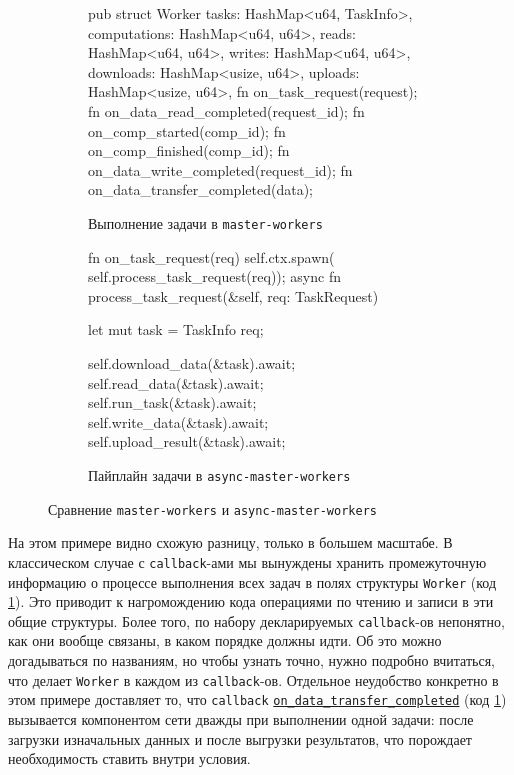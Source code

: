 \begin{figure}[H]
    \hspace{-0.55cm}
    \centering
    \begin{subfigure}[b]{0.537\linewidth}
        \footnotesize
        \centering
        \begin{rustcode}
pub struct Worker {
  tasks: HashMap<u64, TaskInfo>,
  computations: HashMap<u64, u64>,
  reads: HashMap<u64, u64>,
  writes: HashMap<u64, u64>,
  downloads: HashMap<usize, u64>,
  uploads: HashMap<usize, u64>,
}
fn on_task_request(request);
fn on_data_read_completed(request_id);
fn on_comp_started(comp_id);
fn on_comp_finished(comp_id);
fn on_data_write_completed(request_id);
fn on_data_transfer_completed(data);
    \end{rustcode}
        \caption{Выполнение задачи в \texttt{master-workers}}
        \label{master-workers}
    \end{subfigure}
    \hfill
    \begin{subfigure}[b]{0.48\linewidth}
        \footnotesize
        \centering
        \begin{rustcode}
fn on_task_request(req) {
  self.ctx.spawn(
    self.process_task_request(req));
}
async fn process_task_request(&self, req: TaskRequest) {
  let mut task = TaskInfo {req};

  self.download_data(&task).await;
  self.read_data(&task).await;
  self.run_task(&task).await;
  self.write_data(&task).await;
  self.upload_result(&task).await;
}
    \end{rustcode}
    \caption{Пайплайн задачи в \texttt{async-master-workers}}
    \label{async-master-workers}
\end{subfigure}
\caption{Сравнение \texttt{master-workers} и \texttt{async-master-workers}}
\label{master-workers-comparison}
\end{figure}

На этом примере видно схожую разницу, только в большем масштабе. В классическом случае с \texttt{callback}-ами мы вынуждены хранить промежуточную информацию о процессе выполнения всех задач в полях структуры \texttt{Worker} (код \ref{master-workers}). Это приводит к нагромождению кода операциями по чтению и записи в эти общие структуры. Более того, по набору декларируемых \texttt{callback}-ов непонятно, как они вообще связаны, в каком порядке должны идти. Об это можно догадываться по названиям, но чтобы узнать точно, нужно подробно вчитаться, что делает \texttt{Worker} в каждом из \texttt{callback}-ов. Отдельное неудобство конкретно в этом примере доставляет то, что \texttt{callback} \texttt{\underline{on\_data\_transfer\_completed}} (код \ref{master-workers}) вызывается компонентом сети дважды при выполнении одной задачи: после загрузки изначальных данных и после выгрузки результатов, что порождает необходимость ставить внутри условия.  

